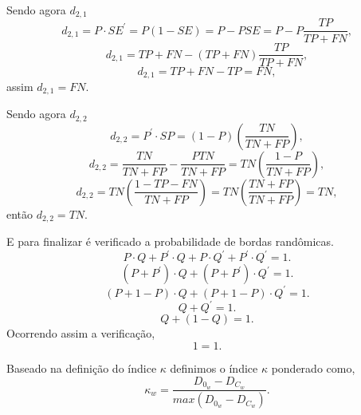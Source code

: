 Sendo agora $d_{2,1}$
\begin{equation}\nonumber
	d_{2,1}=P\cdot SE^{'} = P(1-SE)=P-PSE=P-P\frac{TP}{TP + FN},
\end{equation}
\begin{equation}\nonumber
	d_{2,1}=TP+FN-(TP + FN)\frac{TP}{TP + FN},
\end{equation}
\begin{equation}\label{cap_fusao_46}
	d_{2,1}=TP+FN-TP=FN,
\end{equation}
assim $d_{2,1} = FN$.

Sendo agora $d_{2,2}$
\begin{equation}\nonumber
	d_{2,2}=P^{'}\cdot SP = (1-P)\left(\frac{TN}{TN + FP}\right),
\end{equation}
\begin{equation}\nonumber
	d_{2,2}=\frac{TN}{TN + FP}-\frac{PTN}{TN + FP}=TN\left(\frac{1-P}{TN + FP}\right),
\end{equation}
\begin{equation}\label{cap_fusao_47}
	d_{2,2}=TN\left(\frac{1-TP-FN}{TN + FP}\right)=TN\left(\frac{TN+FP}{TN + FP}\right)=TN,
\end{equation}
então $d_{2,2}=TN$.


E para finalizar é verificado a probabilidade de bordas randômicas.
\begin{equation}\nonumber
	P\cdot Q + P^{'}\cdot Q+P\cdot Q^{'} + P^{'}\cdot Q^{'} = 1.
\end{equation}
\begin{equation}\nonumber
	(P + P^{'})\cdot Q + (P + P^{'}) \cdot Q^{'} = 1.
\end{equation}
\begin{equation}\nonumber
	(P + 1 -P)\cdot Q + (P + 1 - P) \cdot Q^{'} = 1.
\end{equation}
\begin{equation}\nonumber
	 Q +  Q^{'} = 1.
\end{equation}
\begin{equation}\nonumber
	 Q + (1 - Q) = 1.
\end{equation}
Ocorrendo assim a verificação,
\begin{equation}\nonumber
	 1 = 1.
\end{equation}


Baseado na definição do índice $\kappa$ definimos o índice $\kappa$ ponderado como,
\begin{equation}\label{cap_fusao_48}
\kappa_w = \frac{D_{0_w} - D_{C_w}}{max(D_{0_w} - D_{C_w})}.
\end{equation}

